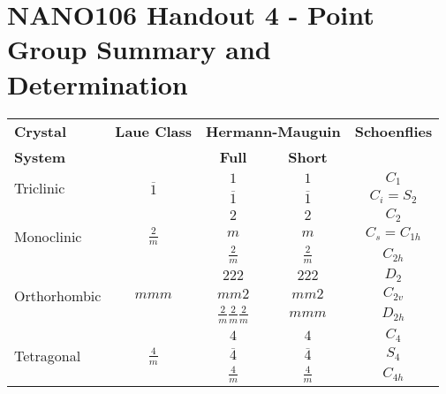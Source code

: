 
\usepackage{multirow}
\usepackage{pdfpages}
\def\mytitle{NANO106 Handout 4 - Point Groups}
\def\latexmode{mavrldoc}


\chapter{NANO106 Handout 4 - Point Group Summary and Determination}
\begin{table}[h]
\centering
\small
  \begin{tabular}{lcccc}
    \hline
	\textbf{Crystal}           & \textbf{Laue Class}             & \multicolumn{2}{l}{\textbf{Hermann-Mauguin}} & \textbf{Schoenflies}\\
   	\textbf{System}            &                                 & \textbf{Full} & \textbf{Short }              & \\
   	\hline
   	\hline
   	\multirow{2}{*}{Triclinic} & \multirow{2}{*}{$\overline{1}$} & $1$ & $1$ & $C_1$\\
                               &                                 & $\overline{1}$ & $\overline{1}$ & $C_i = S_2$ \\
    \hline
    \multirow{3}{*}{Monoclinic} & \multirow{3}{*}{$\displaystyle \frac{2}{m}$} & $2$ & $2$ & $C_2$\\
                               &                                 & $m$ & $m$ & $C_s = C_{1h}$ \\
                               &                                 & $\displaystyle \frac{2}{m}$ & $\displaystyle \frac{2}{m}$ & $C_{2h}$ \\[1.5ex]
    \hline 
    \multirow{3}{*}{Orthorhombic} & \multirow{3}{*}{$mmm$} & $222$ & $222$ & $D_2$\\
                               &                           & $mm2$ & $mm2$ & $C_{2v}$ \\
                               &                           & $\displaystyle \frac{2}{m}\frac{2}{m}\frac{2}{m}$ & $mmm$ & $D_{2h}$ \\[1.5ex]
    \hline
    \multirow{7}{*}{Tetragonal} & \multirow{3}{*}{$\displaystyle \frac{4}{m}$} & $4$ & $4$ & $C_4$\\
                               &                                 & $\overline{4}$ & $\overline{4}$ & $S_4$ \\
                               &                                 & $\displaystyle \frac{4}{m}$ & $\displaystyle \frac{4}{m}$ & $C_{4h}$ \\[1.5ex]

\end{tabular}
\end{table}
